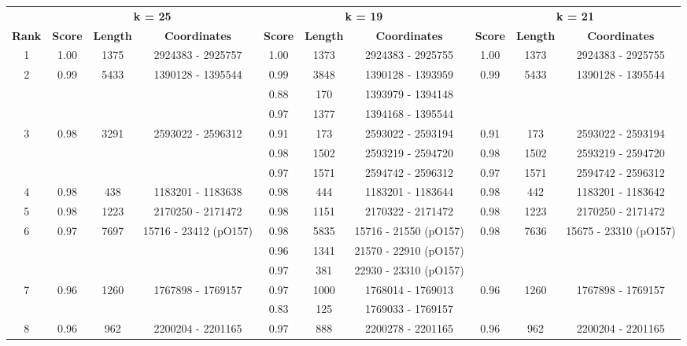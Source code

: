 \documentclass[a4paper,10pt]{article}
\begin{document}
\begin{landscape}
\mbox{}\vfill
\begin{table}[!h]
\renewcommand{\arraystretch}{1.2}
\centering
\begin{tabular}{| c | c c c | c c c | c c c |}
  \cline{1-10}
  & \multicolumn{3}{c|}{\textbf{k = 25}} & \multicolumn{3}{c|}{\textbf{k = 19}} & \multicolumn{3}{c|}{\textbf{k = 21}} \\
  \cline{2-4} \cline{5-7} \cline{8-10}
  \textbf{Rank} & \textbf{Score} & \textbf{Length} & \textbf{Coordinates} & \textbf{Score} & \textbf{Length} & \textbf{Coordinates} & \textbf{Score} & \textbf{Length} & \textbf{Coordinates} \\ \cline{1-10}
  1 & 1.00 & 1375 & 2924383 - 2925757 & 1.00 & 1373 & 2924383 - 2925755 & 1.00 & 1373 & 2924383 - 2925755 \\ \cline{1-10}
  2 & 0.99 & 5433 & 1390128 - 1395544 & 0.99 & 3848 & 1390128 - 1393959 & 0.99 & 5433 & 1390128 - 1395544 \\
  & & & & 0.88 & 170 & 1393979 - 1394148 & & & \\ 
  & & & & 0.97 & 1377 & 1394168 - 1395544 & & & \\ \cline{1-10}
  3 & 0.98 & 3291 & 2593022 - 2596312 & 0.91 & 173 & 2593022 - 2593194 & 0.91 & 173 & 2593022 - 2593194 \\
  & & & & 0.98 & 1502 & 2593219 - 2594720 & 0.98 & 1502 & 2593219 - 2594720 \\ 
  & & & & 0.97 & 1571 & 2594742 - 2596312 & 0.97 & 1571 & 2594742 - 2596312 \\ \cline{1-10}
  4 & 0.98 & 438 & 1183201 - 1183638 & 0.98 & 444 & 1183201 - 1183644 & 0.98 & 442 & 1183201 - 1183642 \\ \cline{1-10}
  5 & 0.98 & 1223 & 2170250 - 2171472 & 0.98 & 1151 & 2170322 - 2171472 & 0.98 & 1223 & 2170250 - 2171472 \\ \cline{1-10}
  6 & 0.97 & 7697 & 15716 - 23412 (pO157) & 0.98 & 5835 & 15716 - 21550 (pO157) & 0.98 & 7636 & 15675 - 23310 (pO157) \\
  & & & & 0.96 & 1341 & 21570 - 22910 (pO157) & & & \\ 
  & & & & 0.97 & 381 & 22930 - 23310 (pO157) & & & \\ \cline{1-10}
  7 & 0.96 & 1260 & 1767898 - 1769157 & 0.97 & 1000 & 1768014 - 1769013 & 0.96 & 1260 & 1767898 - 1769157 \\ 
  & & & & 0.83 & 125 & 1769033 - 1769157 & & & \\ \cline{1-10}
  8 & 0.96 & 962 & 2200204 - 2201165 & 0.97 & 888 & 2200278 - 2201165 & 0.96 & 962 & 2200204 - 2201165 \\ \cline{1-10}

\end{tabular}
\end{table}
\end{landscape}
\end{document}
